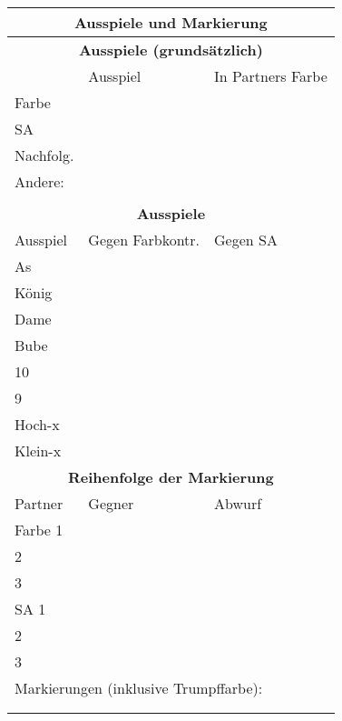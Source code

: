 \documentclass{article}
\begin{document}
\begin{multicols}{3}
\begin{tabular}{|l|l|l|}
\hline \multicolumn{3}{c}{\bf \large Ausspiele und Markierung} \\

\hline \multicolumn{3}{c}{\bf Ausspiele (grundsätzlich)} \\
\hline & Ausspiel & In Partners Farbe \\
\hline Farbe & & \\
\hline SA & & \\
\hline Nachfolg. & & \\
\hline \multicolumn{3}{|l|}{Andere:} \\
       \multicolumn{3}{|l|}{} \\

\hline \multicolumn{3}{c}{\bf Ausspiele} \\
\hline Ausspiel & Gegen Farbkontr. & Gegen SA \\
\hline As & & \\
\hline König & & \\
\hline Dame & & \\
\hline Bube & & \\
\hline 10 & & \\
\hline 9 & & \\
\hline Hoch-x & & \\
\hline Klein-x & & \\

\hline \multicolumn{3}{c}{\bf Reihenfolge der Markierung} \\
\hline Partner & Gegner & Abwurf \\
\hline Farbe \hfill 1 & & \\
\hline       \hfill 2 & & \\
\hline       \hfill 3 & & \\
\hline SA    \hfill 1 & & \\
\hline       \hfill 2 & & \\
\hline       \hfill 3 & & \\
\hline \multicolumn{3}{|l|}{Markierungen (inklusive Trumpffarbe):} \\
       \multicolumn{3}{|l|}{} \\
       \multicolumn{3}{|l|}{} \\


\end{tabular}
\end{multicols}
\end{document}
